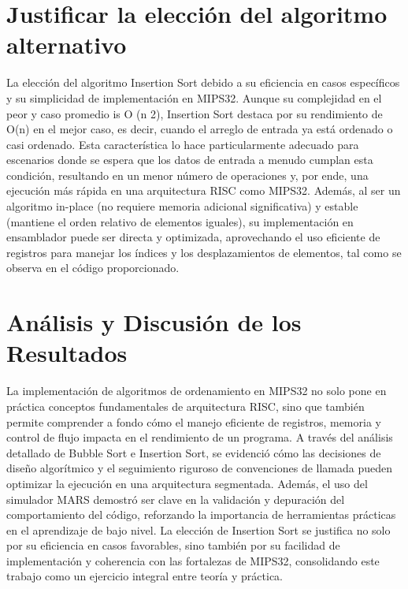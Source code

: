 \documentclass{article}
\begin{document}
\section{Justificar la elección del algoritmo alternativo}
La elección del algoritmo Insertion Sort debido a su eficiencia en casos específicos y su simplicidad de implementación en MIPS32. Aunque su complejidad en el peor y caso promedio is O (n 2), Insertion Sort destaca por su rendimiento de O(n) en el mejor caso, es decir, cuando el arreglo de entrada ya está ordenado o casi ordenado. Esta característica lo hace particularmente adecuado para escenarios donde se espera que los datos de entrada a menudo cumplan esta condición, resultando en un menor número de operaciones y, por ende, una ejecución más rápida en una arquitectura RISC como MIPS32. Además, al ser un algoritmo in-place (no requiere memoria adicional significativa) y estable (mantiene el orden relativo de elementos iguales), su implementación en ensamblador puede ser directa y optimizada, aprovechando el uso eficiente de registros para manejar los índices y los desplazamientos de elementos, tal como se observa en el código proporcionado.

\section{Análisis y Discusión de los Resultados}
La implementación de algoritmos de ordenamiento en MIPS32 no solo pone en práctica conceptos fundamentales de arquitectura RISC, sino que también permite comprender a fondo cómo el manejo eficiente de registros, memoria y control de flujo impacta en el rendimiento de un programa. A través del análisis detallado de Bubble Sort e Insertion Sort, se evidenció cómo las decisiones de diseño algorítmico y el seguimiento riguroso de convenciones de llamada pueden optimizar la ejecución en una arquitectura segmentada. Además, el uso del simulador MARS demostró ser clave en la validación y depuración del comportamiento del código, reforzando la importancia de herramientas prácticas en el aprendizaje de bajo nivel. La elección de Insertion Sort se justifica no solo por su eficiencia en casos favorables, sino también por su facilidad de implementación y coherencia con las fortalezas de MIPS32, consolidando este trabajo como un ejercicio integral entre teoría y práctica.
\end{document}
